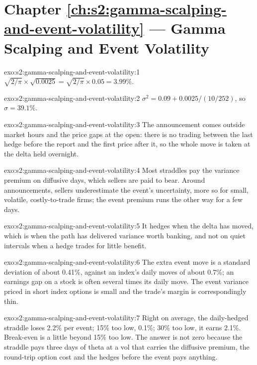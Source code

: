 \section*{Chapter \ref{ch:s2:gamma-scalping-and-event-volatility} --- Gamma Scalping and Event Volatility}

\begin{solution}{exo:s2:gamma-scalping-and-event-volatility:1}
$\sqrt{2/\pi}\times\sqrt{0.0025} = \sqrt{2/\pi}\times 0.05 = 3.99\%$.
\end{solution}

\begin{solution}{exo:s2:gamma-scalping-and-event-volatility:2}
$\sigma^2 = 0.09 + 0.0025/(10/252)$, so $\sigma = 39.1\%$.
\end{solution}

\begin{solution}{exo:s2:gamma-scalping-and-event-volatility:3}
The announcement comes outside market hours and the price gaps at the open: there is no trading between the last hedge before the report and the
first price after it, so the whole move is taken at the delta held overnight.
\end{solution}

\begin{solution}{exo:s2:gamma-scalping-and-event-volatility:4}
Most straddles pay the variance premium on diffusive days, which sellers are paid to bear. Around announcements, sellers underestimate the event's
uncertainty, more so for small, volatile, costly-to-trade firms; the event premium runs the other way for a few days.
\end{solution}

\begin{solution}{exo:s2:gamma-scalping-and-event-volatility:5}
It hedges when the delta has moved, which is when the path has delivered variance worth banking, and not on quiet intervals when a hedge trades for
little benefit.
\end{solution}

\begin{solution}{exo:s2:gamma-scalping-and-event-volatility:6}
The extra event move is a standard deviation of about 0.41\%, against an index's daily moves of about 0.7\%; an earnings gap on a stock is often
several times its daily move. The event variance priced in short index options is small and the trade's margin is correspondingly thin.
\end{solution}

\begin{solution}{exo:s2:gamma-scalping-and-event-volatility:7}
Right on average, the daily-hedged straddle loses 2.2\% per event; 15\% too low, 0.1\%; 30\% too low, it earns 2.1\%. Break-even is a little
beyond 15\% too low. The answer is not zero because the straddle pays three days of theta at a vol that carries the diffusive premium, the round-trip
option cost and the hedges before the event pays anything.
\end{solution}

